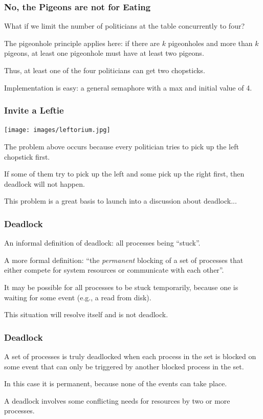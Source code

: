 \begin{frame}
	\frametitle{No, the Pigeons are not for Eating}

	What if we limit the number of politicians at the table concurrently to four?

	The pigeonhole principle applies here: if there are $k$ pigeonholes and more than $k$ pigeons, at least one pigeonhole must have at least two pigeons.

	Thus, at least one of the four politicians can get two chopsticks.

	Implementation is easy: a general semaphore with a max and initial value of 4.

\end{frame}

\begin{frame}
	\frametitle{Invite a Leftie}

	\begin{center}
		\texttt{[image: images/leftorium.jpg]}
	\end{center}

	The problem above occurs because every politician tries to pick up the left chopstick first.

	If some of them try to pick up the left and some pick up the right first, then deadlock will not happen.

	This problem is a great basis to launch into a discussion about deadlock...

\end{frame}



\begin{frame}
	\frametitle{Deadlock}

	An informal definition of deadlock: all processes being ``stuck''.

	A more formal definition: ``the \textit{permanent} blocking of a set of processes that either compete for system resources or communicate with each other''.

	It may be possible for all processes to be stuck temporarily, because one is waiting for some event (e.g., a read from disk).

	This situation will resolve itself and is not deadlock.

\end{frame}


\begin{frame}
	\frametitle{Deadlock}
	A set of processes is truly deadlocked when each process in the set is blocked on some event that can only be triggered by another blocked process in the set.

	In this case it is permanent, because none of the events can take place.

	A deadlock involves some conflicting needs for resources by two or more processes.

\end{frame}

